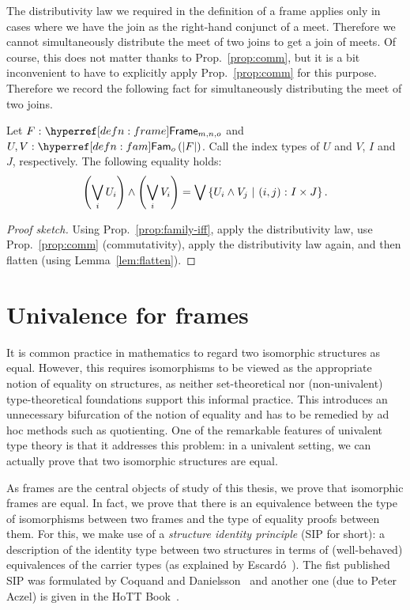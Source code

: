 The distributivity law we required in the definition of a frame applies only in cases
where we have the join as the right-hand conjunct of a meet. Therefore we cannot
simultaneously distribute the meet of two joins to get a join of meets. Of course, this
does not matter thanks to Prop.~\ref{prop:comm}, but it is a bit inconvenient to have to
explicitly apply Prop.~\ref{prop:comm} for this purpose. Therefore we record the following
fact for simultaneously distributing the meet of two joins.

\begin{prop}\label{prop:distr}
  Let $\oftyI{F}{\framety{m}{n}{o}}$ and $\oftyII{U}{V}{\sub{o}{\abs{F}}}$. Call the index
  types of $U$ and $V$, $I$ and $J$, respectively. The following equality holds:
  \begin{equation*}
      \left( \bigvee_i U_i \right) \wedge \left( \bigvee_i V_i \right)
    = \bigvee \left\{  U_i \wedge V_j ~|~ (i, j)\hspace{0.1mm}:\hspace{0.1mm}I \times J  \right\}.
  \end{equation*}
\end{prop}
\begin{proof}[Proof sketch]
  Using Prop.~\ref{prop:family-iff}, apply the distributivity law, use
  Prop.~\ref{prop:comm} (commutativity), apply the distributivity law again, and then
  flatten (using Lemma~\ref{lem:flatten}).
\end{proof}

\section{Univalence for frames}\label{sec:frame-univ}

It is common practice in mathematics to regard two isomorphic structures as equal.
However, this requires isomorphisms to be viewed as the appropriate notion of equality on
structures, as neither set-theoretical nor (non-univalent) type-theoretical foundations
support this informal practice. This introduces an unnecessary bifurcation of the notion
of equality and has to be remedied by ad hoc methods such as quotienting. One of the
remarkable features of univalent type theory is that it addresses this problem: in a
univalent setting, we can actually prove that two isomorphic structures are equal.

As frames are the central objects of study of this thesis, we prove that isomorphic frames
are equal. In fact, we prove that there is an equivalence between the type of isomorphisms
between two frames and the type of equality proofs between them. For this, we make use of
a \emph{structure identity principle} (SIP for short): a description of the identity type
between two structures in terms of (well-behaved) equivalences of the carrier types (as
explained by Escardó~\cite{escardo-uf-intro}). The fist published SIP was formulated by
Coquand and Danielsson~\cite{coq-nad} and another one (due to Peter Aczel) is given in the
HoTT Book~\cite{hottbook}.

